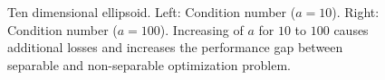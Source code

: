 \begin{figure}[h!]
\begin{minipage}[b]{0.5\linewidth}
 \centering
\end{minipage}
\begin{minipage}[b]{0.5\linewidth}
 \centering
\end{minipage}
\caption{Ten dimensional ellipsoid. Left: Condition number ($a=10$).  Right: Condition number ($a=100$). Increasing of $a$ for $10$ to $100$ causes additional losses and increases the performance gap between separable and non-separable optimization problem.} 
\label{ellipse_t1}
\end{figure}

